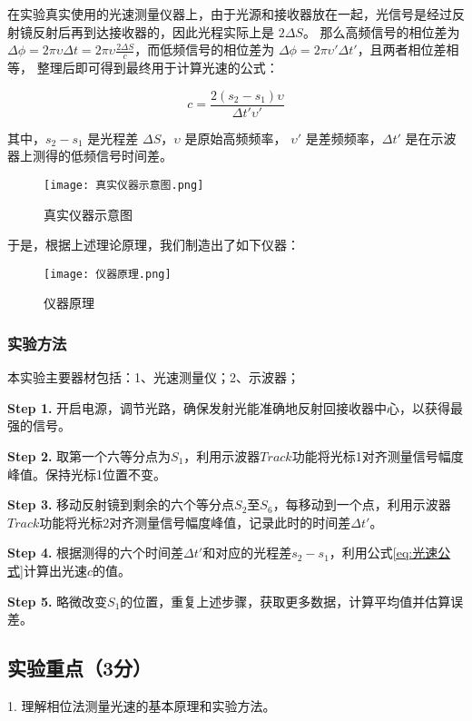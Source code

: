 \documentclass{Phyport}
\begin{document}
在实验真实使用的光速测量仪器上，由于光源和接收器放在一起，光信号是经过反射镜反射后再到达接收器的，因此光程实际上是 $2\Delta S$。
那么高频信号的相位差为 $\Delta\phi = 2\pi \upsilon  \Delta t = 2\pi \upsilon  \frac{2\Delta S}{c}$，而低频信号的相位差为 $\Delta\phi = 2\pi \upsilon ' \Delta t'$，且两者相位差相等，
整理后即可得到最终用于计算光速的公式：

\begin{equation}
\label{eq:光速公式}
c = \frac{2(s_2 - s_1)\upsilon }{\Delta t' \upsilon '}
\end{equation}

其中，$s_2 - s_1$ 是光程差 $\Delta S$，$\upsilon $ 是原始高频频率， $\upsilon '$ 是差频频率，$\Delta t'$ 是在示波器上测得的低频信号时间差。

\begin{figure}[H]
    \centering
    \texttt{[image: 真实仪器示意图.png]}
    \caption{真实仪器示意图}
    \label{fig:真实仪器示意图}
\end{figure}

于是，根据上述理论原理，我们制造出了如下仪器：
\begin{figure}[H]
    \centering
    \texttt{[image: 仪器原理.png]}
    \caption{仪器原理}
    \label{fig:仪器原理}
\end{figure}


\subsubsection{实验方法}
本实验主要器材包括：1、光速测量仪；2、示波器；


\textbf{Step 1.} 开启电源，调节光路，确保发射光能准确地反射回接收器中心，以获得最强的信号。

\textbf{Step 2.} 取第一个六等分点为$S_1$，利用示波器$Track$功能将光标1对齐测量信号幅度峰值。保持光标1位置不变。

\textbf{Step 3.} 移动反射镜到剩余的六个等分点$S_2$至$S_6$，每移动到一个点，利用示波器$Track$功能将光标2对齐测量信号幅度峰值，记录此时的时间差$\Delta t'$。

\textbf{Step 4.} 根据测得的六个时间差$\Delta t'$和对应的光程差$s_2 - s_1$，利用公式\eqref{eq:光速公式}计算出光速$c$的值。

\textbf{Step 5.} 略微改变$S_1$的位置，重复上述步骤，获取更多数据，计算平均值并估算误差。




\subsection{实验重点（3分）}
1. 理解相位法测量光速的基本原理和实验方法。
\end{document}
